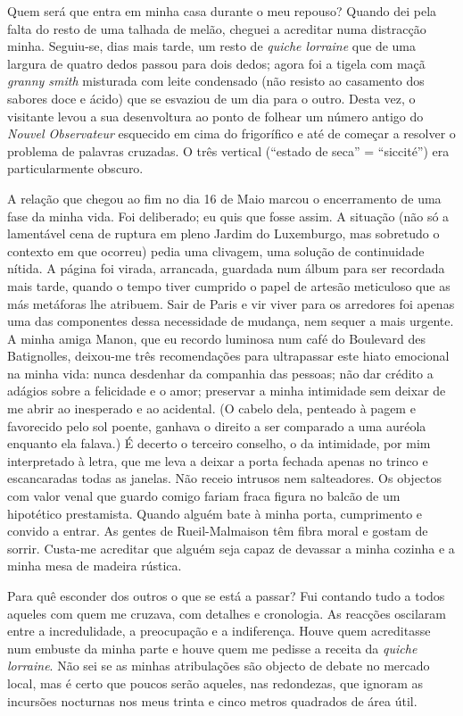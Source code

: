 Quem será que entra em minha casa durante o meu repouso? Quando dei
pela falta do resto de uma talhada de melão, cheguei a acreditar numa
distracção minha. Seguiu-se, dias mais tarde, um resto de \emph{quiche lorraine }que de uma
largura de quatro dedos passou para dois dedos; agora foi a tigela com
maçã \emph{granny smith }misturada com leite condensado (não resisto ao
casamento dos sabores doce e ácido) que se esvaziou de um dia para o
outro. Desta vez, o visitante levou a sua desenvoltura ao ponto de
folhear um número antigo do \emph{Nouvel Observateur }esquecido em cima
do frigorífico e até de começar a resolver o problema de palavras
cruzadas. O três vertical (``estado de seca'' = ``siccité'') era
particularmente obscuro.

A relação que chegou ao fim no dia 16 de Maio marcou o encerramento de
uma fase da minha vida. Foi deliberado; eu quis que fosse assim. A
situação (não só a lamentável cena de ruptura em pleno Jardim do
Luxemburgo, mas sobretudo o contexto em que ocorreu) pedia uma clivagem,
uma solução de continuidade nítida. A página foi virada, arrancada,
guardada num álbum para ser recordada mais tarde, quando o tempo tiver
cumprido o papel de artesão meticuloso que as más metáforas lhe
atribuem. Sair de Paris e vir viver para os arredores foi apenas uma das
componentes dessa necessidade de mudança, nem sequer a mais urgente. A
minha amiga Manon, que eu recordo luminosa num café do Boulevard des
Batignolles, deixou-me três recomendações para ultrapassar este hiato
emocional na minha vida: nunca desdenhar da companhia das pessoas; não
dar crédito a adágios sobre a felicidade e o amor; preservar a minha
intimidade sem deixar de
me abrir ao inesperado e ao acidental. (O cabelo dela, penteado à
pagem e favorecido pelo sol poente, ganhava o direito a ser comparado a
uma auréola enquanto ela falava.) É decerto o terceiro conselho, o da
intimidade, por mim interpretado à letra, que me leva a deixar a porta
fechada apenas no trinco e escancaradas todas as janelas. Não receio
intrusos nem salteadores. Os objectos com valor venal que guardo
comigo fariam fraca figura no balcão de um hipotético prestamista.
Quando alguém bate à minha porta, cumprimento e convido a entrar. As
gentes de Rueil-Malmaison têm fibra moral e gostam de sorrir. Custa-me
acreditar que alguém seja capaz de devassar a minha cozinha e a minha
mesa de madeira rústica.

Para quê esconder dos outros o que se está a passar? Fui contando tudo a
todos aqueles com quem me cruzava, com detalhes e cronologia. As
reacções oscilaram entre a incredulidade, a preocupação e a
indiferença. Houve quem acreditasse num embuste da minha parte e houve
quem me pedisse a receita da \emph{quiche lorraine}. Não sei se as
minhas atribulações são objecto de debate no mercado local, mas é certo
que poucos serão aqueles, nas redondezas, que ignoram as incursões
nocturnas nos meus trinta e cinco metros quadrados de área útil.

